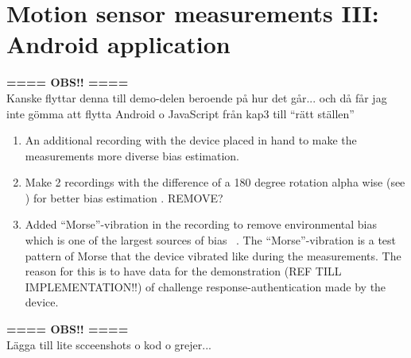 \section{Motion sensor measurements III: Android application}
\textbf{ ==== OBS!! ====}\\
Kanske flyttar denna till demo-delen beroende på hur det går... och då får jag inte gömma att flytta Android o JavaScript från kap3 till ``rätt ställen'' \\
\begin{enumerate}
  \item An additional recording with the device placed in hand to make the measurements more diverse bias estimation. 
  \item Make 2 recordings with the difference of a 180 degree rotation alpha wise (see ) for better bias estimation \cite{acc:kionixerr}. REMOVE?
  \item Added ``Morse''-vibration in the recording to remove environmental bias which is one of the largest sources of bias ~\cite[p.8]{acc:kionixerr}. The ``Morse''-vibration is a test pattern of Morse that the device vibrated like during the measurements. The reason for this is to have data for the demonstration (REF TILL IMPLEMENTATION!!) of challenge response-authentication made by the device.
\end{enumerate}
\textbf{ ==== OBS!! ====}\\
Lägga till lite scceenshots o kod o grejer...

